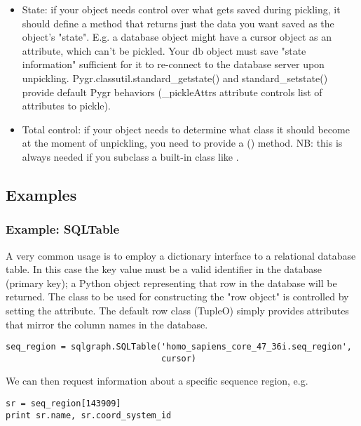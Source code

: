 \documentclass{howto}
\begin{document}
\begin{itemize}
\begin{itemize}
\item State: if your object needs control over what gets saved during pickling,
it should define a  method that returns just the
data you want saved as the object's "state".  E.g. a database object might have a
cursor object as an attribute, which can't be pickled.  Your db object must
save "state information" sufficient for it to re-connect to the database server
upon unpickling.  Pygr.classutil.standard_getstate() and standard_setstate()
provide default Pygr behaviors (_pickleAttrs attribute controls list of attributes
to pickle).

\item Total control: if your object needs to determine what class it should
become at the moment of unpickling, you need to provide a ()
method.  NB: this is always needed if you subclass a built-in class like .
\end{itemize}

\subsection{Examples}
\subsubsection{Example: SQLTable}
A very common usage is to employ a dictionary interface to a relational
database table.  In this case the key value must be a valid identifier
in the database (primary key); a Python object representing that row in the database
will be returned.  The class to be used for constructing the "row object"
is controlled by setting the  attribute.  The default
row class (TupleO) simply provides attributes that mirror the column names
in the database.
\begin{verbatim}
seq_region = sqlgraph.SQLTable('homo_sapiens_core_47_36i.seq_region',
                               cursor) 
\end{verbatim}
We can then request information about a specific sequence region, e.g.
\begin{verbatim}
sr = seq_region[143909]
print sr.name, sr.coord_system_id
\end{verbatim}


\end{itemize}
\end{document}
